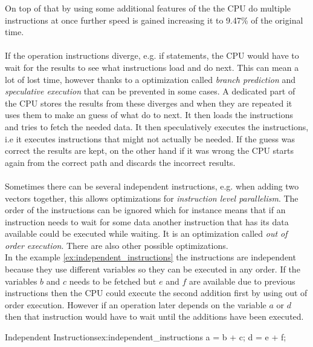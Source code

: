 \documentclass[10pt,a4paper]{report}
\newcounter{example}
\begin{document}
On top of that by using some additional features of the the CPU do multiple instructions at once further speed is gained increasing it to 9.47\% of the original time\cite{drepper2007cpumemory}. \\
\\
If the operation instructions diverge, e.g. if statements, the CPU would have to wait for the results to see what instructions load and do next\cite{drepper2007cpumemory}. This can mean a lot of lost time, however thanks to a optimization called \emph{branch prediction} and \emph{speculative execution} that can be prevented in some cases\cite{drepper2007cpumemory}. A dedicated part of the CPU stores the results from these diverges and when they are repeated it uses them to make an guess of what do to next\cite{drepper2007cpumemory}. It then loads the instructions and tries to fetch the needed data\cite{drepper2007cpumemory}. It then speculatively executes the instructions, i.e it executes instructions that might not actually be needed\cite{drepper2007cpumemory}. If the guess was correct the results are kept, on the other hand if it was wrong the CPU starts again from the correct path and discards the incorrect results\cite{drepper2007cpumemory}.\\
\\
Sometimes there can be several independent instructions, e.g. when adding two vectors together, this allows optimizations for \emph{instruction level parallelism}\cite{introduction_hpc_hager}. The order of the instructions can be ignored which for instance means that if an instruction needs to wait for some data another instruction that has its data available could be executed while waiting\cite{introduction_hpc_hager}. It is an optimization called \emph{out of order execution}\cite{introduction_hpc_hager}. There are also other possible optimizations\cite{introduction_hpc_hager}.
\\
In the example \ref{ex:independent_instructions} the instructions are independent because they use different variables so they can be executed in any order. If the variables $b$ and $c$ needs to be fetched but $e$ and $f$ are available due to previous instructions then the CPU could execute the second addition first by using out of order execution. However if an operation later depends on the variable $a$ or $d$ then that instruction would have to wait until the additions have been executed.

\begin{example}{Independent Instructions}{ex:independent_instructions}
a = b + c;
d = e + f;
\end{example}
\end{document}
